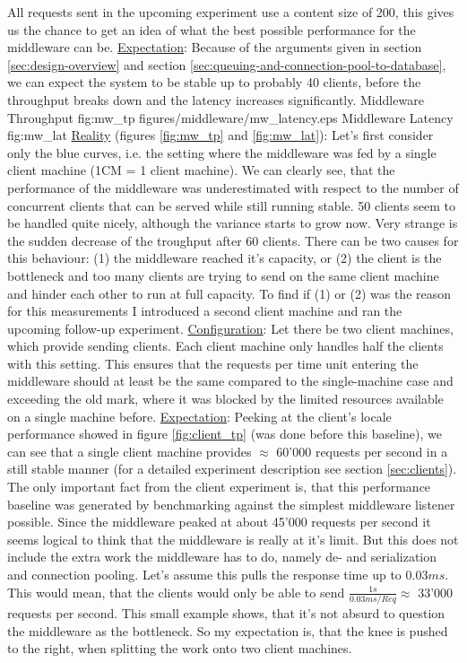 \documentclass[11pt]{article}
\begin{document}
All requests sent in the upcoming experiment use a content size of 200, this gives us the chance to get an idea of what the best possible performance for the middleware can be.
\newline\underline{Expectation}: Because of the arguments given in section \ref{sec:design-overview} and section \ref{sec:queuing-and-connection-pool-to-database}, we can expect the system to be stable up to probably 40 clients, before the throughput breaks down and the latency increases significantly.
 {Middleware Throughput} {fig:mw_tp}
{figures/middleware/mw_latency.eps} {Middleware Latency} {fig:mw_lat}
\newline\underline{Reality} (figures \ref{fig:mw_tp} and \ref{fig:mw_lat}): Let's first consider only the blue curves, i.e. the setting where the middleware was fed by a single client machine  (1CM = 1 client machine). We can clearly see, that the performance of the middleware was underestimated with respect to the number of concurrent clients that can be served while still running stable. 50 clients seem to be handled quite nicely, although the variance starts to grow now. Very strange is the sudden decrease of the troughput after 60 clients. There can be two causes for this behaviour: (1) the middleware reached it's capacity, or (2) the client is the bottleneck and too many clients are trying to send on the same client machine and hinder each other to run at full capacity. To find if (1) or (2) was the reason for this measurements I introduced a second client machine and ran the upcoming follow-up experiment.
\newline\underline{Configuration}: Let there be two client machines, which provide sending clients. Each client machine only handles half the clients with this setting. This ensures that the requests per time unit entering the middleware should at least be the same compared to the single-machine case and exceeding the old mark, where it was blocked by the limited resources available on a single machine before. 
\newline\underline{Expectation}: Peeking at the client's locale performance showed in figure \ref{fig:client_tp} (was done before this baseline), we can see that a single client machine provides $\approx$ 60'000 requests per second in a still stable manner (for a detailed experiment description see section \ref{sec:clients}). The only important fact from the client experiment is, that this performance baseline was generated by benchmarking against the simplest middleware listener possible. Since the middleware peaked at about 45'000 requests per second it seems logical to think that the middleware is really at it's limit. But this does not include the extra work the middleware has to do, namely de- and serialization and connection pooling. Let's assume this pulls the response time up to $0.03ms$. This would mean, that the clients would only be able to send $\frac{1s}{0.03ms/Req}\approx$ 33'000 requests per second. This small example shows, that it's not absurd to question the middleware as the bottleneck. So my expectation is, that the knee is pushed to the right, when splitting the work onto two client machines.
\end{document}
